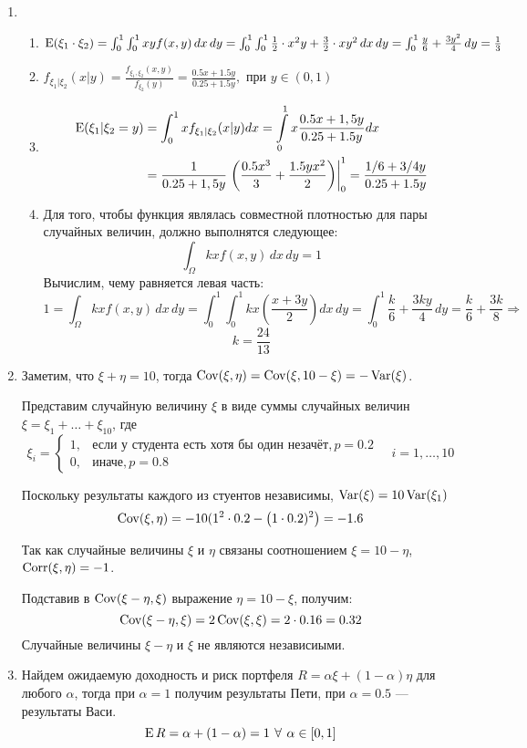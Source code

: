 \begin{enumerate}
\item
\begin{enumerate}
\item $ \operatorname{E}({\xi_1 \cdot \xi_2}) = \int_{0}^1 \int_0^1 xy f(x,y) \, dx \, dy = \int_0^1 \int_0^1 \frac{1}{2}\cdot x^2y + \frac{3}{2}\cdot xy^2 \, dx \, dy = \int_{0}^1 \frac{y}{6} + \frac{3y^2}{4} \,dy = \frac{1}{3}$
\item $f_{\xi_1 | \xi_2} (x | y) = \frac{f_{\xi_1, \xi_2}(x, y)}{f_{\xi_2}(y)} = \frac{0.5x + 1.5y}{0.25 + 1.5y}, \text{ при } y \in (0,1)$
\item
\begin{align*}
\operatorname{E}(\xi_1 | \xi_2 = y) &= \int_0^1 x f_{\xi_1 | \xi_2} (x | y) dx = \int\limits_{0}^{1}  x \frac{0.5x + 1,5y}{0.25 + 1.5y} dx \\
&= \frac{1}{0.25 + 1,5y}  \left. \left( \dfrac{0.5x^3}{3} +  \dfrac{1.5yx^2}{2} \right) \right|_0^1  =  \frac{1/6 + 3/4y}{0.25 + 1.5y}
\end{align*}
\item
Для того, чтобы функция являлась совместной плотностью для пары случайных величин, должно выполнятся следующее:
\[
\int_{\Omega} kx f(x,y) \, dx \, dy = 1
\]
Вычислим, чему равняется левая часть:
\[
1 = \int_{\Omega} kx f(x,y) \, dx \, dy = \int_{0}^1 \int_{0}^1 kx \left(\frac{x + 3y}{2}\right) dx \, dy = \int_{0}^1 \frac{k}{6} + \frac{3ky}{4} \, dy = \frac{k}{6} + \frac{3k}{8} \Rightarrow
\]
\[
k = \frac{24}{13}
\]
\end{enumerate}
\item Заметим, что $\xi + \eta = 10$, тогда $\operatorname{Cov}(\xi, \eta) = \operatorname{Cov}(\xi, 10-\xi) = -\operatorname{Var}(\xi)$.

Представим случайную величину $\xi$ в виде суммы случайных величин $\xi = \xi_1 + \ldots + \xi_{10}$, где
\[
\xi_i = \begin{cases}
1, & \text{если у студента есть хотя бы один незачёт}, p=0.2 \\
0, & \text{иначе}, p=0.8
\end{cases} \quad i = 1, \ldots, 10
\]

Поскольку результаты каждого из стуентов независимы, $\operatorname{Var}(\xi) = 10\operatorname{Var}(\xi_1)$
\[
\operatorname{Cov}(\xi, \eta) = -10(1^2 \cdot 0.2 - \left(1\cdot 0.2)^2\right) = -1.6
\]

Так как случайные величины $\xi$ и $\eta$ связаны соотношением $\xi = 10 - \eta$, $\operatorname{Corr}(\xi, \eta)=-1$.

Подставив в $\operatorname{Cov}(\xi - \eta, \xi)$ выражение $\eta = 10 - \xi$, получим:
\[
\operatorname{Cov}(\xi - \eta, \xi) = 2 \operatorname{Cov}(\xi, \xi) = 2 \cdot 0.16 = 0.32
\]
Случайные величины $\xi - \eta$ и $\xi$ не являются независиыми.
\item Найдем ожидаемую доходность и риск портфеля $R = \alpha \xi + (1-\alpha) \eta$
для любого $\alpha$, тогда при $\alpha = 1$ получим результаты Пети,
при $\alpha = 0.5$ — результаты Васи.
\[
\operatorname{E} R = \alpha + (1 - \alpha) = 1 \: \, \forall \, \: \alpha \in [0,1]
\]


\end{enumerate}
